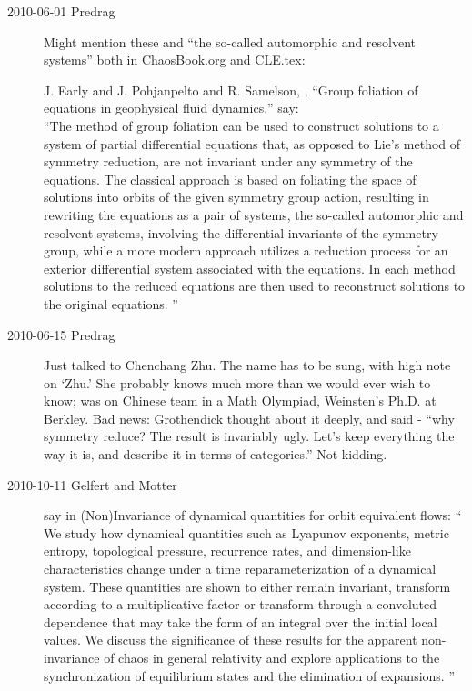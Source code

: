 \begin{description}
\item[2010-06-01 Predrag]
Might mention these and ``the so-called automorphic and resolvent systems''
both in ChaosBook.org and CLE.tex:

J. Early and J. Pohjanpelto and R. Samelson,
,
{``Group foliation of equations in geophysical fluid dynamics,''}
say:\\
``The method of group foliation can be used to construct solutions
to a system of partial differential equations that, as opposed to Lie's method of
symmetry reduction, are not invariant under any symmetry of the equations.
The classical approach is based on foliating the space of solutions into orbits
of the given symmetry group action, resulting in rewriting the equations as a
pair of systems, the so-called automorphic and resolvent systems, involving the
differential invariants of the symmetry group, while a more modern approach
utilizes a reduction process for an exterior differential system associated with
the equations. In each method solutions to the reduced equations are then used
to reconstruct solutions to the original equations.
''


\item[2010-06-15 Predrag] Just talked to
{Chenchang Zhu}. The name has to be sung, with high note on `Zhu.'
She probably knows much more than we would ever wish to know;
was on Chinese team in a Math Olympiad, Weinsten's Ph.D. at Berkley.
Bad news: Grothendick thought about it deeply, and said
													\toCB
 - ``why
symmetry reduce? The result is invariably ugly. Let's keep everything
the way it is, and describe it in terms of categories.'' Not kidding.

\item[2010-10-11 Gelfert and Motter] say in
 {(Non)Invariance}  of dynamical
quantities for orbit equivalent flows: `` We study how dynamical
quantities such as Lyapunov exponents, metric entropy, topological
pressure, recurrence rates, and dimension-like characteristics change
under a time reparameterization of a dynamical system. These quantities
are shown to either remain invariant, transform according to a
multiplicative factor or transform through a convoluted dependence that
may take the form of an integral over the initial local values. We
discuss the significance of these results for the apparent non-invariance
of chaos in general relativity and explore applications to the
synchronization of equilibrium states and the elimination of expansions.
''


\end{description}
